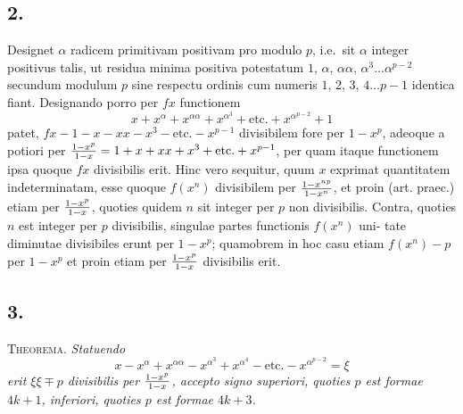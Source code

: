 \documentclass[twoside,12pt, showframe]{memoir}
\let\oldfrac\frac
\def\frac#1#2{\mathchoice{\tfrac{#1}{#2}}{\oldfrac{#1}{#2}}{\genfrac{}{}{}{2}{#1}{#2\mathstrut}}{\genfrac{}{}{}{3}{#1}{#2\mathstrut}}}
\begin{document}
\subsection*{2.}
 
Designet \(\alpha\) radicem primitivam positivam pro modulo \(p\), i.e.\ sit \(\alpha\) integer positivus talis, ut residua minima positiva potestatum \(1\), \(\alpha\), \(\alpha \alpha\), \(\alpha^{3} \ldots \alpha^{p-2}\) secundum modulum \(p\) sine respectu ordinis cum numeris \(1\), \(2\), \(3\), \(4 \ldots p-1\) identica fiant. Designando porro per \(f x\) functionem
\[x+x^{\alpha}+x^{\alpha \alpha}+x^{\alpha^{3}}+\text{etc.}+x^{\alpha^{p-2}}+1\]
patet, \(f x-1-x-x x-x^{3}-\text{etc.}-x^{p-1}\) divisibilem fore per \(1-x^{p}\), adeoque a potiori per \(\frac{1-x^{p}}{1-x}=1+x+x x+x^{3}+\text{etc.}+x^{p-1}\), per quam itaque functionem ipsa quoque \(f x\) divisibilis erit. Hinc vero sequitur, quum \(x\) exprimat quantitatem indeterminatam, esse quoque \(f(x^{n})\) divisibilem per \(\frac{1-x^{n p}}{1-x^{n}}\), et proin (art. praec.) etiam per \(\frac{1-x^{p}}{1-x}\), quoties quidem \(n\) sit integer per \(p\) non divisibilis. Contra, quoties \(n\) est integer per \(p\) divisibilis, singulae partes functionis \(f(x^{n})\) uni-\clearpage\noindent%
tate diminutae divisibiles erunt per \(1-x^{p}\); quamobrem in hoc casu etiam \(f(x^{n})-p\) per \(1-x^{p}\) et proin etiam per \(\frac{1-x^{p}}{1-x}\) divisibilis erit.

\subsection*{3.}
 
\textsc{Theorema.} \textit{Statuendo}
\[x-x^{\alpha}+x^{\alpha \alpha}-x^{\alpha^{3}}+x^{\alpha^{4}}-\text{etc.}-x^{\alpha^{p-2}}=\xi\]
\textit{erit \(\xi \xi \mp p\) divisibilis per \(\frac{1-x^{p}}{1- x}\), accepto signo superiori, quoties \(p\) est formae \(4 k+1\), inferiori, quoties \(p\) est formae \(4 k+3\).}
 
\end{document}
